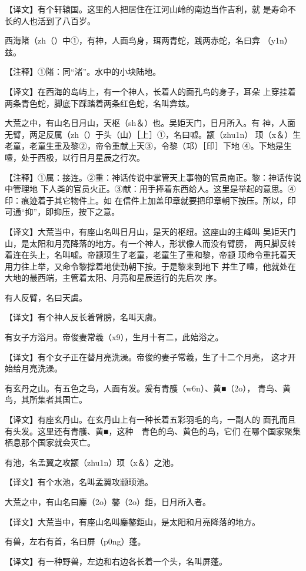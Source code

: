 \documentclass[a4paper,12pt,UTF8,twoside]{ctexbook}
\begin{document}
【译文】有个轩辕国。这里的人把居住在江河山岭的南边当作吉利，就 是寿命不长的人也活到了八百岁。

西海陼（zh（）中①，有神，人面鸟身，珥两青蛇，践两赤蛇，名曰弇 （y1n）兹。

【注释】①陼：同“渚”。水中的小块陆地。

【译文】在西海的岛屿上，有一个神人，长着人的面孔鸟的身子，耳朵 上穿挂着两条青色蛇，脚底下踩踏着两条红色蛇，名叫弇兹。

大荒之中，有山名日月山，天枢（sh＆）也。吴姖天门，日月所入。有 神，人面无臂，两足反属（zh（）于头（山）［上］①，名曰嘘。颛（zhu1n） 顼（x＆）生老童，老童生重及黎②，帝令重献上天③，令黎（邛）［印］下地 ④。下地是生噎，处于西极，以行日月星辰之行次。

【注释】①属：接连。②重：神话传说中掌管天上事物的官员南正。黎：神话传说中管理地 下人类的官员火正。③献：用手捧着东西给人。这里是举起的意思。④印：痕迹着于其它物件上。如 在信件上加盖印章就要把印章朝下按压。所以，印可通“抑”，即抑压，按下之意。

【译文】大荒当中，有座山名叫日月山，是天的枢纽。这座山的主峰叫 吴姖天门山，是太阳和月亮降落的地方。有一个神人，形状像人而没有臂膀， 两只脚反转着连在头上，名叫嘘。帝颛顼生了老童，老童生了重和黎，帝颛 顼命令重托着天用力往上举，又命令黎撑着地使劲朝下按。于是黎来到地下 并生了噎，他就处在大地的最西端，主管着太阳、月亮和星辰运行的先后次 序。

有人反臂，名曰天虞。

【译文】有个神人反长着臂膀，名叫天虞。

有女子方浴月。帝俊妻常羲（x9），生月十有二，此始浴之。

【译文】有个女子正在替月亮洗澡。帝俊的妻子常羲，生了十二个月亮， 这才开始给月亮洗澡。

有玄丹之山。有五色之鸟，人面有发。爰有青雘（w6n）、黄■（2o）， 青鸟、黄鸟，其所集者其国亡。

【译文】有座玄丹山。在玄丹山上有一种长着五彩羽毛的鸟，一副人的 面孔而且有头发。这里还有青雘、黄■，这种　青色的鸟、黄色的鸟，它们 在哪个国家聚集栖息那个国家就会灭亡。

有池，名孟翼之攻颛（zhu1n）顼（x＆）之池。

【译文】有个水池，名叫孟翼攻颛顼池。

大荒之中，有山名曰鏖（2o）鏊（2o）鉅，日月所入者。

【译文】大荒当中，有座山名叫鏖鏊鉅山，是太阳和月亮降落的地方。

有兽，左右有首，名曰屏（p0ng）蓬。

【译文】有一种野兽，左边和右边各长着一个头，名叫屏蓬。
\end{document}
